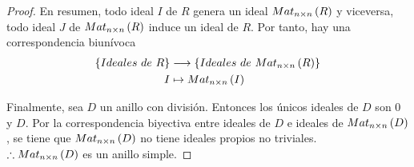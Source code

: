 \documentclass{article}
\begin{document}
\begin{enumerate}
\begin{proof}
		En resumen, todo ideal $I$ de $R$ genera un ideal $Mat_{n \times n}\left(R\right)$ y viceversa, todo ideal $J$ de $Mat_{n \times n}\left(R\right)$ induce un ideal de $R$. Por tanto, hay una correspondencia biunívoca
		\begin{align*}
			\left\{Ideales\ de\ R\right\} &\longrightarrow \left\{Ideales\ de\ Mat_{n \times n}\left(R\right)\right\}\\
			I &\mapsto Mat_{n \times n}\left(I\right)
		\end{align*}
		
		Finalmente, sea $D$ un anillo con división. Entonces los únicos ideales de $D$ son $0$ y $D$. Por la correspondencia biyectiva entre ideales de $D$ e ideales de $Mat_{n \times n}\left(D\right)$, se tiene que $Mat_{n \times n}\left(D\right)$ no tiene ideales propios no triviales.\\
		$\therefore Mat_{n \times n}\left(D\right)$ es un anillo simple.
	\end{proof}
\end{enumerate}
\end{document}
